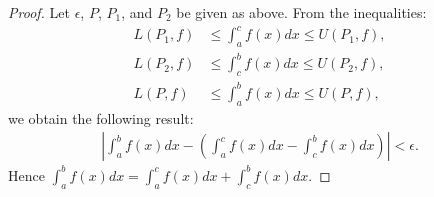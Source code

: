 \documentclass[11pt,twoside,openany]{memoir}
\begin{document}
\begin{proof}
            Let $\epsilon$, $P$, $P_1$, and $P_2$ be given as above. From the inequalities:
                \begin{equation*}
                \begin{split}
                    L(P_1,f) &\leq \int_a^c f(x)dx \leq U(P_1,f), \\
                    L(P_2,f) &\leq \int_c^b f(x)dx \leq U(P_2,f), \\
                    L(P,f) &\leq \int_a^b f(x)dx \leq U(P,f),
                \end{split}
                \end{equation*}
            we obtain the following result:
                \begin{equation*}
                \begin{split}
                    \left| \int_a^b f(x)dx - \left( \int_a^c f(x)dx - \int_c^b f(x)dx \right) \right| < \epsilon.
                \end{split}
                \end{equation*}
            Hence $\int_a^b f(x)dx = \int_a^c f(x)dx + \int_c^b f(x)dx$.
            
        \end{proof}
\end{document}
